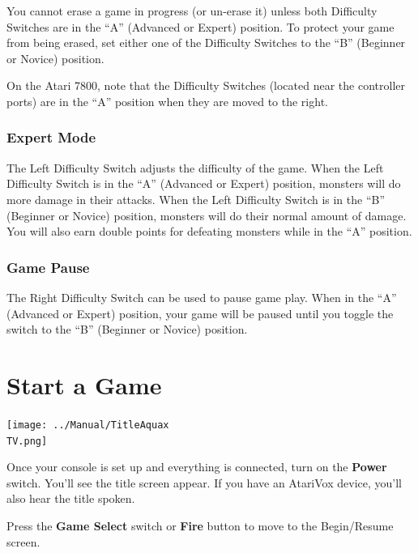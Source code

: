 \documentclass[10pt,twocolumn,openany,article]{memoir}
\newcommand\TV{NTSC}
\newcommand\TV{PAL}
\newcommand\TV{SECAM}
\begin{document}
\ifdefined\NOSAVE\else

You  cannot erase  a  game  in progress  (or  un-erase  it) unless  both
Difficulty  Switches are  in the  ``A'' (Advanced  or Expert)  position.
To protect your game from being erased, set either one of the Difficulty
Switches to the ``B'' (Beginner or Novice) position.

On the Atari  7800, note that the Difficulty Switches  (located near the
controller  ports) are  in the  ``A'' position  when they  are moved  to
the right.

\fi

\subsubsection*{Expert Mode}

The Left Difficulty Switch adjusts the  difficulty of the game. When the
Left Difficulty  Switch is in  the ``A'' (Advanced or  Expert) position,
monsters will do more damage in  their attacks. When the Left Difficulty
Switch is in  the ``B'' (Beginner or Novice) position,  monsters will do
their normal  amount of  damage. You  will also  earn double  points for
defeating monsters while in the ``A'' position.

\ifdefined\TVSECAM

\subsubsection*{Game Pause}

The Right Difficulty Switch  can be used to pause game  play. When in the
``A'' (Advanced or Expert) position, your  game will be paused until you
toggle the switch to the ``B'' (Beginner or Novice) position.

\fi

\section{Start a Game}

\begin{center}
  \texttt{[image: ../Manual/TitleAquax\\TV.png]}
\end{center}

Once your  console is set  up and everything  is connected, turn  on the
\textbf{Power} switch. You'll  see the title screen appear.  If you have
an AtariVox device, you'll also hear the title spoken.

Press the \textbf{Game Select} switch or \textbf{Fire} button to move to
the
\ifdefined\NOSAVE
Begin/Resume screen.
\end{document}
